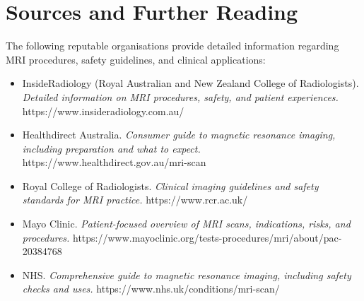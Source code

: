 \section*{Sources and Further Reading}
The following reputable organisations provide detailed information regarding MRI procedures, safety guidelines, and clinical applications:
\begin{itemize}
    \item InsideRadiology (Royal Australian and New Zealand College of Radiologists). \textit{Detailed information on MRI procedures, safety, and patient experiences.} https://www.insideradiology.com.au/
    \item Healthdirect Australia. \textit{Consumer guide to magnetic resonance imaging, including preparation and what to expect.} https://www.healthdirect.gov.au/mri-scan
    \item Royal College of Radiologists. \textit{Clinical imaging guidelines and safety standards for MRI practice.} https://www.rcr.ac.uk/
    \item Mayo Clinic. \textit{Patient-focused overview of MRI scans, indications, risks, and procedures.} https://www.mayoclinic.org/tests-procedures/mri/about/pac-20384768
    \item NHS. \textit{Comprehensive guide to magnetic resonance imaging, including safety checks and uses.} https://www.nhs.uk/conditions/mri-scan/
\end{itemize}
